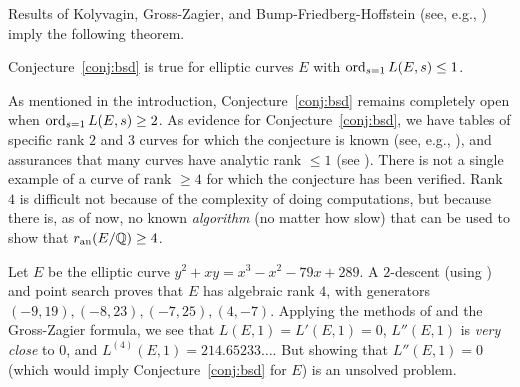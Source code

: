 \documentclass{article} \usepackage[active]{srcltx}
\begin{document}
Results of Kolyvagin, Gross-Zagier, and Bump-Friedberg-Hoffstein (see, e.g.,
\cite{bump-friedberg-hoffstein:nonvanishing, gross-zagier,
kolyvagin:weil}) imply the following theorem.
\begin{theorem}\label{thm:bsd1} Conjecture~\ref{conj:bsd} is true for elliptic curves
$E$ with $\operatorname{ord}_{s=1} L(E,s) \leq 1$.
\end{theorem} 

As mentioned in the introduction, Conjecture~\ref{conj:bsd} remains
completely open when $\operatorname{ord}_{s=1} L(E,s) \geq 2$.  As evidence for
Conjecture~\ref{conj:bsd}, we have tables of specific rank $2$ and $3$
curves for which the conjecture is known (see, e.g.,
\cite{cremona:onlinetables,stein-watkins:ants5}), and assurances that
many curves have analytic rank $\leq 1$ (see
\cite{bhargava-shankar:avgrank}).  There is not a single example of a
curve of rank $\geq 4$ for which the conjecture has been verified.
Rank $4$ is difficult not because of the complexity of doing
computations, but because there is, as of now, no known {\em
  algorithm} (no matter how slow) that can be used to show that
$r_{{\rm an}}(E/\mathbb{Q})\geq 4$.

\begin{example} 
Let $E$ be the elliptic curve $y^2 + xy = x^3 - x^2
- 79x + 289$. A $2$-descent (using \cite{mwrank, sage}) and point search proves 
that $E$ has algebraic rank $4$, with generators
$\left(-9, 19 \right), \left(-8, 23 \right), \left(-7, 25\right), \left(4, -7\right)$.
Applying the methods of \cite{cremona:algs, dokchitser:lfun} and the
Gross-Zagier formula, we see that $L(E,1)=L'(E,1)=0$, $L''(E,1)$ is
{\em very close} to 0, and $L^{(4)}(E,1)=214.65233\ldots$. But showing
that $L''(E,1)=0$ (which would imply Conjecture~\ref{conj:bsd} for
$E$) is an unsolved problem.  
\end{example}
\end{document}

